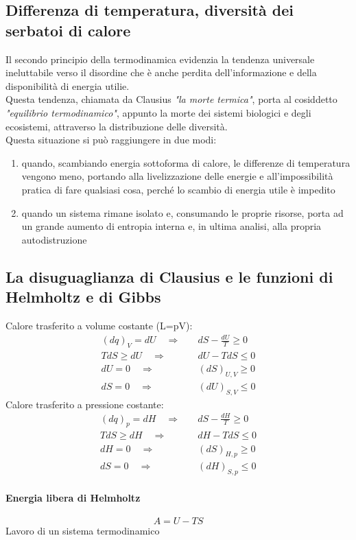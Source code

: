 \documentclass{article}
\newcommand{\So}{\quad \Rightarrow \quad}
\begin{document}
\subsection{Differenza di temperatura, diversità dei serbatoi di calore}
Il secondo principio della termodinamica evidenzia la tendenza universale ineluttabile verso il disordine che è anche perdita dell'informazione e della disponibilità di energia utilie.\\
Questa tendenza, chiamata da Clausius \textit{"la morte termica"}, porta al cosiddetto \textit{"equilibrio termodinamico"}, appunto la morte dei sistemi biologici e degli ecosistemi, attraverso la distribuzione delle diversità.\\
Questa situazione si può raggiungere in due modi:
\begin{enumerate}
    \item quando, scambiando energia sottoforma di calore, le differenze di temperatura vengono meno, portando alla livelizzazione delle energie e all'impossibilità pratica di fare qualsiasi cosa, perché lo scambio di energia utile è impedito
    \item quando un sistema rimane isolato e, consumando le proprie risorse, porta ad un grande aumento di entropia interna e, in ultima analisi, alla propria autodistruzione
\end{enumerate}

\subsection{La disuguaglianza di Clausius e le funzioni di Helmholtz e di Gibbs}
Calore trasferito a volume costante (L=pV):
\begin{align*}
    (dq)_V=dU \So& dS-\frac{dU}{T}\ge0\\
    TdS\ge dU \So& dU-TdS\le0\\
    dU=0 \So& (dS)_{U,V}\ge0\\
    dS=0 \So& (dU)_{S,V}\le0
\end{align*}
Calore trasferito a pressione costante:
\begin{align*}
    (dq)_p=dH \So& dS-\frac{dH}{T}\ge0\\
    TdS\ge dH \So& dH-TdS\le0\\
    dH=0 \So& (dS)_{H,p}\ge0\\
    dS=0 \So& (dH)_{S,p}\le0
\end{align*}
\paragraph{Energia libera di Helmholtz}
\begin{equation*}
    A=U-TS
\end{equation*}
Lavoro di un sistema termodinamico
\end{document}
